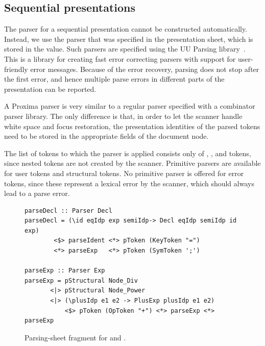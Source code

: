 \documentclass[12pt]{article}
\begin{document}



\subsection{Sequential presentations}

The parser for a sequential presentation cannot be constructed automatically. Instead, we use the parser that was specified in the presentation sheet, which is stored in the  value. Such parsers are specified using the UU Parsing library~\cite{swierstra03polishParsers, swierstra08parserCombinators}. This is a library for creating fast error correcting parsers with support for user-friendly error messages. Because of the error recovery, parsing does not stop after the first error, and hence multiple parse errors in different parts of the presentation can be reported. 

A Proxima parser is very similar to a regular parser specified with a combinator parser library. The only difference is that, in order to let the scanner handle white space and focus restoration, the presentation identities of the parsed tokens need to be stored in the appropriate fields of the document node. 

The list of tokens to which the parser is applied consists only of , , and  tokens, since nested  tokens are not created by the scanner. Primitive parsers are available for user tokens and structural tokens. No primitive parser is offered for error tokens, since these represent a lexical error by the scanner, which should always lead to a parse error.



\begin{figure}
\begin{center}
\begin{footnotesize}
\begin{verbatim}
parseDecl :: Parser Decl
parseDecl = (\id eqIdp exp semiIdp-> Decl eqIdp semiIdp id exp)
        <$> parseIdent <*> pToken (KeyToken "=") 
        <*> parseExp   <*> pToken (SymToken ';')
       
parseExp :: Parser Exp
parseExp = pStructural Node_Div
       <|> pStructural Node_Power
       <|> (\plusIdp e1 e2 -> PlusExp plusIdp e1 e2)
           <$> pToken (OpToken "+") <*> parseExp <*> parseExp
\end{verbatim}
\end{footnotesize}
\end{center}
\caption{Parsing-sheet fragment for  and .} \label{fig:parser} 
\end{figure}
\end{document}
